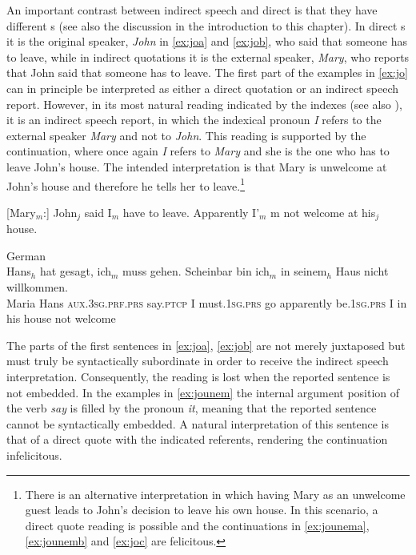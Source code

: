 An important contrast between indirect speech and direct  is that they have different  s (see also  the discussion in the introduction to this chapter). In direct  s it is the original speaker, \emph{John} in \eqref{ex:joa} and \eqref{ex:job},  who  said that someone has to leave,  while in indirect  quotations it is the external speaker, \emph{Mary},  who reports that John said that someone has to leave. The first part of the examples in \eqref{ex:jo} can in principle be interpreted as either a direct quotation or an indirect speech report. However, in its most natural reading indicated by the indexes (see also \citealt{Gutzmann2011a}), it is an indirect speech report, in which the indexical pronoun \emph{I} refers to the external speaker \emph{Mary} and not to \emph{John}. This reading is supported by the continuation, where once again \emph{I} refers to \emph{Mary} and she is the one who has to leave John's house. The intended interpretation is that Mary is unwelcome at John's house and therefore he tells her to leave.\footnote{There is an alternative interpretation in which having Mary as an unwelcome guest leads to John's decision to leave his own house. In this scenario,  a direct quote reading is possible  and the continuations in \eqref{ex:jounema}, \eqref{ex:jounemb} and \eqref{ex:joc}  are felicitous.}

\ea\label{ex:jo}
\ea\label{ex:joa} [Mary$_m$:] John$_j$  said I$_m$ have to leave. Apparently I'$_m$ m not welcome at his$_j$ house.
	
	\ex \label{ex:job}
	German\\
	\gll [Maria$_m$:] Hans$_h$ hat gesagt, ich$_m$ muss gehen. Scheinbar bin ich$_m$ in seinem$_h$ Haus nicht willkommen. \\
	 Maria Hans \textsc{aux.3sg.prf.prs} say.\textsc{ptcp} I must.\textsc{1sg.prs} go apparently be.\textsc{1sg.prs} I in his house not welcome\\
	\z	
\z

The parts of the first sentences in \eqref{ex:joa}, \eqref{ex:job} are not merely juxtaposed but must truly be syntactically subordinate in order to receive the indirect speech interpretation. Consequently, the  reading is lost when the reported sentence is not embedded. In the examples in \eqref{ex:jounem} the internal argument position of the verb \emph{say} is filled by the pronoun \emph{it}, meaning that the reported sentence cannot be syntactically embedded.  A natural  interpretation of this sentence is that of a direct quote with the indicated referents, rendering the continuation infelicitous.

